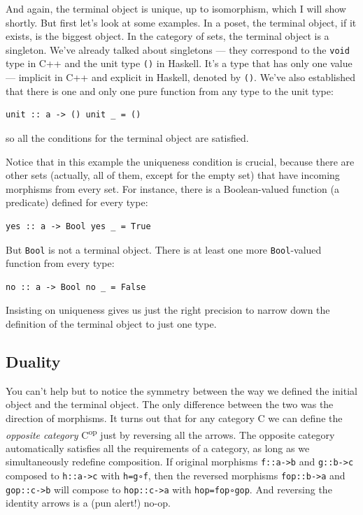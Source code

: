 And again, the terminal object is unique, up to isomorphism, which I
will show shortly. But first let's look at some examples. In a poset,
the terminal object, if it exists, is the biggest object. In the
category of sets, the terminal object is a singleton. We've already
talked about singletons --- they correspond to the \texttt{void} type in
C++ and the unit type \texttt{()} in Haskell. It's a type that has only
one value --- implicit in C++ and explicit in Haskell, denoted by
\texttt{()}. We've also established that there is one and only one pure
function from any type to the unit type:

\begin{verbatim}
unit :: a -> () unit _ = ()
\end{verbatim}

so all the conditions for the terminal object are satisfied.

Notice that in this example the uniqueness condition is crucial, because
there are other sets (actually, all of them, except for the empty set)
that have incoming morphisms from every set. For instance, there is a
Boolean-valued function (a predicate) defined for every type:

\begin{verbatim}
yes :: a -> Bool yes _ = True
\end{verbatim}

But \texttt{Bool} is not a terminal object. There is at least one more
\texttt{Bool}-valued function from every type:

\begin{verbatim}
no :: a -> Bool no _ = False
\end{verbatim}

Insisting on uniqueness gives us just the right precision to narrow down
the definition of the terminal object to just one type.

\subsection{Duality}\label{duality}

You can't help but to notice the symmetry between the way we defined the
initial object and the terminal object. The only difference between the
two was the direction of morphisms. It turns out that for any category C
we can define the \emph{opposite category} C\textsuperscript{op} just by
reversing all the arrows. The opposite category automatically satisfies
all the requirements of a category, as long as we simultaneously
redefine composition. If original morphisms
\texttt{f::a-\textgreater{}b} and \texttt{g::b-\textgreater{}c} composed
to \texttt{h::a-\textgreater{}c} with \texttt{h=g∘f}, then the reversed
morphisms \texttt{fop::b-\textgreater{}a} and
\texttt{gop::c-\textgreater{}b} will compose to
\texttt{hop::c-\textgreater{}a} with \texttt{hop=fop∘gop}. And reversing
the identity arrows is a (pun alert!) no-op.

